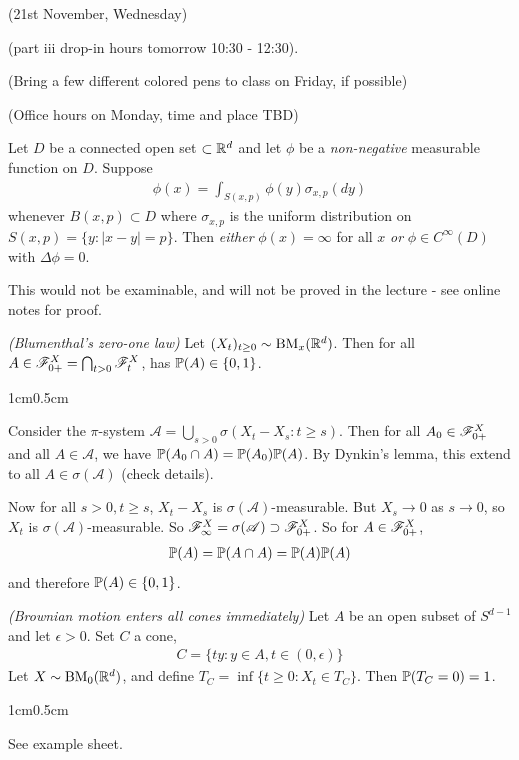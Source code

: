 \documentclass[12pt,a4paper]{report}
\newenvironment{proof}
{\begin{changemargin}{1cm}{0.5cm} 
	}%
	{\end{changemargin}
}
\begin{document}
\newday

(21st November, Wednesday)
\s

(part iii drop-in hours tomorrow 10:30 - 12:30).

(Bring a few different colored pens to class on Friday, if possible)

(Office hours on Monday, time and place TBD)
\s

 Let $D$ be a connected open set $\subset \mathbb{R}^d$ and let $\phi$ be a \emph{non-negative} measurable function on $D$. Suppose
\begin{align*}
\phi(x) = \int_{S(x,p)} \phi(y) \sigma_{x,p}(dy)
\end{align*}
whenever $B(x,p) \subset D$ where $\sigma_{x,p}$ is the uniform distribution on $S(x,p) = \{ y : |x-y| =p \}$. Then \emph{either} $\phi(x) = \infty$ for all $x$ \emph{or} $\phi \in C^{\infty}(D)$ with $\Delta \phi =0$.
\s

This would not be examinable, and will not be proved in the lecture - see online notes for proof.
\s

 \emph{(Blumenthal's zero-one law)} Let $(X_t)_{t\geq 0} \sim \text{BM}_x(\mathbb{R}^d)$. Then for all $A\in \mathscr{F}_{0+}^{X} = \bigcap_{t>0} \mathscr{F}_{t}^X$, has $\mathbb{P}(A) \in \{ 0,1\}$.
\begin{proof}
\pf Consider the $\pi$-system $\mathscr{A} = \bigcup_{s>0} \sigma (X_t - X_s : t\geq s)$. Then for all $A_0 \in \mathscr{F}_{0+}^X$ and all $A \in \mathscr{A}$, we have $\mathbb{P}(A_0 \cap A) = \mathbb{P}(A_0) \mathbb{P}(A)$. By Dynkin's lemma, this extend to all $A\in \sigma(\mathscr{A})$ (check details).

Now for all $s>0, t\geq s$, $X_t - X_s$ is $\sigma(\mathscr{A})$-measurable. But $X_s \rightarrow 0$ as $s\rightarrow 0$, so $X_t$ is $\sigma(\mathscr{A})$-measurable. So $\mathscr{F}_{\infty}^X = \sigma(\mathscr{A}) \supset \mathscr{F}_{0+}^X$. So for $A\in \mathscr{F}_{0+}^X$,
\begin{align*}
\mathbb{P}(A) = \mathbb{P}(A\cap A) = \mathbb{P}(A)\mathbb{P}(A)
\end{align*}
and therefore $\mathbb{P}(A) \in \{0,1\}$.

\eop
\end{proof}
\s

 \emph{(Brownian motion enters all cones immediately)} Let $A$ be an open subset of $S^{d-1}$ and let $\epsilon>0$. Set $C$ a cone,
\begin{align*}
C = \{ty : y\in A, t\in (0,\epsilon) \}
\end{align*} 
Let $X \sim \text{BM}_0(\mathbb{R}^d)$, and define $T_C = \inf \{ t\geq 0: X_t \in T_C \}$. Then $\mathbb{P}(T_C =0)=1$. 
\begin{proof}
See example sheet.
\end{proof}
\s
\end{document}
